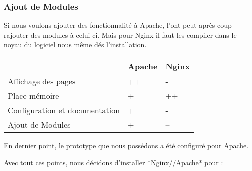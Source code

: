 \subsubsection{Ajout de Modules}
Si nous voulons ajouter des fonctionnalité à Apache, l'ont peut après coup rajouter des modules à celui-ci. Mais pour Nginx il faut les compiler dans le noyau du logiciel nous même dés l'installation.


\begin{tabular}{|m{125pt}|m{50pt}|m{50pt}|}
	\hline
	\null & \textbf{Apache} & \textbf{Nginx} \\
	\hline
	Affichage des pages & ++ & -\\
	\hline
	Place mémoire & +- & ++\\
	\hline
	Configuration et documentation & + & - \\
	\hline
	Ajout de Modules & + & -- \\
	\hline
\end{tabular} \vspace*{5mm}



En dernier point, le prototype que nous possédons a été configuré pour Apache.

Avec tout ces points, nous décidons d'installer *Nginx//Apache* pour :

